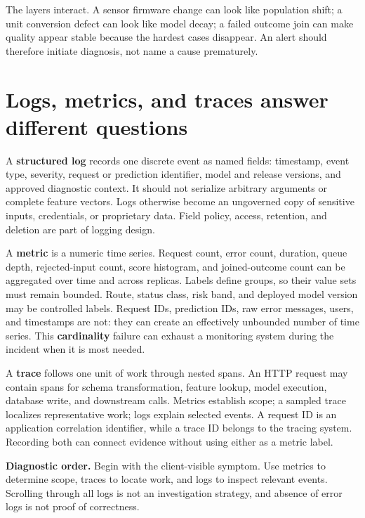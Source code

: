 The layers interact. A sensor firmware change can look like population shift; a
unit conversion defect can look like model decay; a failed outcome join can
make quality appear stable because the hardest cases disappear. An alert should
therefore initiate diagnosis, not name a cause prematurely.


\section{Logs, metrics, and traces answer different questions}

A \textbf{structured log} records one discrete event as named fields: timestamp,
event type, severity, request or prediction identifier, model and release
versions, and approved diagnostic context. It should not serialize arbitrary
arguments or complete feature vectors. Logs otherwise become an ungoverned copy
of sensitive inputs, credentials, or proprietary data. Field policy, access,
retention, and deletion are part of logging design.

A \textbf{metric} is a numeric time series. Request count, error count, duration,
queue depth, rejected-input count, score histogram, and joined-outcome count can
be aggregated over time and across replicas. Labels define groups, so their
value sets must remain bounded. Route, status class, risk band, and deployed
model version may be controlled labels. Request IDs, prediction IDs, raw error
messages, users, and timestamps are not: they can create an effectively
unbounded number of time series. This \textbf{cardinality} failure can exhaust a
monitoring system during the incident when it is most needed.

A \textbf{trace} follows one unit of work through nested spans. An HTTP request
may contain spans for schema transformation, feature lookup, model execution,
database write, and downstream calls. Metrics establish scope; a sampled trace
localizes representative work; logs explain selected events. A request ID is an
application correlation identifier, while a trace ID belongs to the tracing
system. Recording both can connect evidence without using either as a metric
label.

\textbf{Diagnostic order.} Begin with the client-visible symptom. Use metrics to
determine scope, traces to locate work, and logs to inspect relevant events.
Scrolling through all logs is not an investigation strategy, and absence of
error logs is not proof of correctness.

